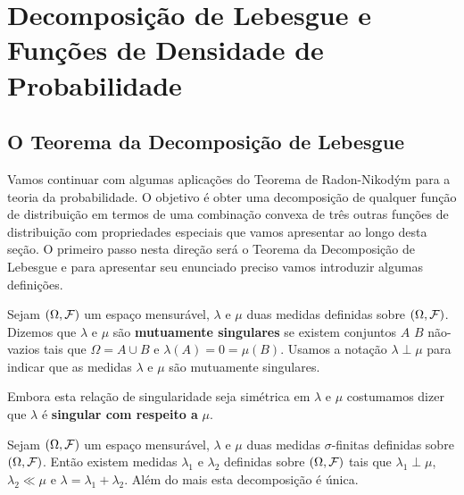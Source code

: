 \chapter[Aula 14]{Decomposição de Lebesgue e Funções de Densidade de Probabilidade}
\chaptermark{}

\section{O Teorema da Decomposição de Lebesgue}

Vamos continuar com algumas aplicações do Teorema 
de Radon-Nikodým para a teoria da probabilidade.
O objetivo é obter uma decomposição de qualquer 
função de distribuição em termos de uma combinação 
convexa de três outras funções de distribuição 
com propriedades especiais que vamos apresentar
ao longo desta seção. O primeiro passo nesta
direção será o Teorema da Decomposição de Lebesgue 
e para apresentar seu enunciado preciso vamos 
introduzir algumas definições. 


\begin{definicao}
Sejam $(\Omega,\mathcal{F})$ um espaço mensurável,
$\lambda$ e $\mu$ duas medidas definidas 
sobre $(\Omega,\mathcal{F})$.
Dizemos que $\lambda$ e $\mu$ são 
{\bf mutuamente singulares} 
se existem conjuntos $A$ $B$ não-vazios 
tais que $\Omega = A\cup B$ e $\lambda(A)=0=\mu(B)$.
Usamos a notação $\lambda\perp \mu$ para indicar 
que as medidas $\lambda$ e $\mu$ são mutuamente 
singulares. 
\end{definicao}


Embora esta relação de singularidade seja simétrica 
em $\lambda$ e $\mu$ costumamos dizer que $\lambda$
é {\bf singular com respeito a} $\mu$.


\begin{teorema}
\label{teo-decomposicao-lebesgue}
Sejam $(\Omega,\mathcal{F})$ um espaço mensurável,
$\lambda$ e $\mu$ duas medidas $\sigma$-finitas 
definidas sobre $(\Omega,\mathcal{F})$.
Então existem medidas 
$\lambda_1$ e $\lambda_2$ definidas sobre  $(\Omega,\mathcal{F})$
tais que $\lambda_1\perp \mu$, $\lambda_2\ll \mu$ 
e $\lambda = \lambda_1+\lambda_2$. Além do mais esta 
decomposição é única.
\end{teorema}

